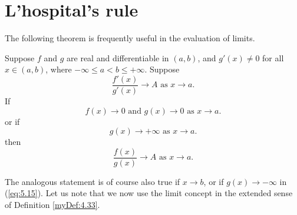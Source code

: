 \section{L'hospital's rule}
The following theorem is frequently useful in the evaluation of limits.

\begin{thm}
    \label{thm:5.13}
    Suppose $f$ and $g$ are real and differentiable in $(a, b)$, 
    and $g'(x) \neq 0$ for all $x \in (a, b)$, 
    where $-\infty \leq a < b \leq + \infty$. 
    Suppose
    \begin{equation}
        \label{eq:5.13}
        \frac{f'(x)}{g'(x)}\rightarrow A 
        \text{ as } x \rightarrow a.
    \end{equation}
    If 
    \begin{equation}
        \label{eq:5.14}
        f(x) \rightarrow 0
        \text{ and }
        g(x) \rightarrow 0
        \text{ as } x \rightarrow a.
    \end{equation}
    or if 
    \begin{equation}
        \label{eq:5.15}
        g(x) \rightarrow +\infty 
        \text{ as } x \rightarrow a.
    \end{equation}
    then
    \begin{equation}
        \label{eq:5.16}
        \frac{f(x)}{g(x)} \rightarrow A
        \text{ as } x \rightarrow a.
    \end{equation}
\end{thm}
The analogous statement is of course also true if $x \rightarrow b$, 
or if $g(x) \rightarrow -\infty $ in (\ref{eq:5.15}). 
Let us note that we now use the limit concept in the extended sense of
Definition \ref{myDef:4.33}.
